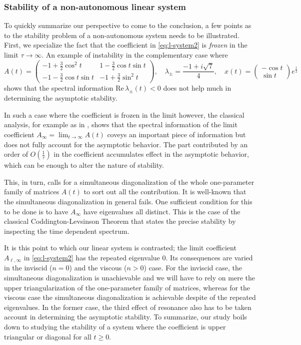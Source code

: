 \documentclass[a4paper,11pt]{article}
\theoremstyle{remark}
\begin{document}
{\subsubsection{Stability of a non-autonomous linear system}
To quickly summarize our perspective to come to the conclusion, a few points as to the stability problem of a non-autonomous system needs to be illustrated. First, we specialize the fact that the coefficient in \eqref{eq:l-system2} is {\it frozen} in the limit $\tau \rightarrow \infty$. An example of instability in the complementary case where
$$ A(t) = \left(\begin{array}{cc} -1 + \frac{3}{2}\cos^2 t & 1-\frac{3}{2}\cos t \sin t \\ -1 -\frac{3}{2}\cos t \sin t & -1 + \frac{3}{2}\sin^2 t \end{array}\right), \quad \lambda_\pm = \frac{-1 + i\sqrt{7}}{4}, \quad x(t) = \left(\begin{array}{c} -\cos t\\ \sin t \end{array}\right) e^{\tfrac{t}{2}}$$
shows that the spectral information  $\textrm{Re}\, \lambda_\pm(t)<0$ does not help much in determining the asymptotic stability.

In such a case where the coefficient is frozen in the limit however, the classical analysis, for example as in \cite{CL1955}, shows that the spectral information of the limit coefficient $\displaystyle A_\infty=\lim_{t \rightarrow\infty} A(t)$ coveys an important piece of information but does not fully account for the asymptotic behavior. The part contributed by an order of $O(\tfrac{1}{\tau})$ in the coefficient accumulates effect in the asymptotic behavior, which can be enough to alter the nature of stability.

This, in turn, calls for a simultaneous diagonalization of the whole one-parameter family of matrices $A(t)$ to sort out all the contribution. It is well-known that the simultaneous diagonalization in general fails. One sufficient condition for this to be done is to have $A_\infty$ have eigenvalues all distinct. This is the case of the classical Coddington-Levsinson Theorem \cite{CL1955} that states the precise stability by inspecting the time dependent spectrum.

It is this point to which our linear system is contrasted; the limit coefficient $A_{\ell,\infty}$ in \eqref{eq:l-system2} has the repeated eigenvalue $0$. Its consequences are varied in the inviscid ($n=0$) and the viscous ($n>0$) case. For the inviscid case, the simultaneous diagonalization is unachievable and we will have to rely on mere the upper triangularization of the one-parameter family of matrices, whereas for the viscous case the simultaneous diagonalization is achievable despite of the repeated eigenvalues. In the former case, the third effect of resonance also has to be taken account in determining the asymptotic stability. To summarize, our study boils down to studying the stability of a system where the coefficient is upper triangular or diagonal for all $t\ge0$.

}
\end{document}
